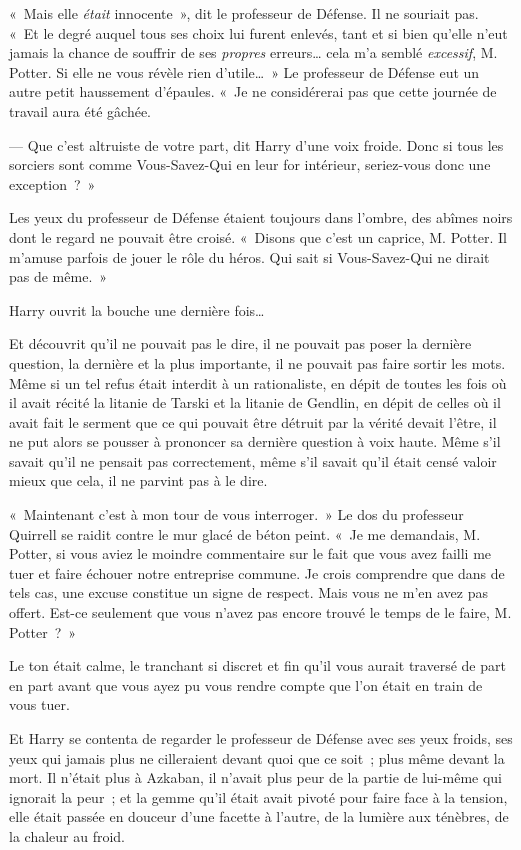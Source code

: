 «~Mais elle \emph{était} innocente~», dit le professeur de Défense. Il ne souriait pas. «~Et le degré auquel tous ses choix lui furent enlevés, tant et si bien qu'elle n'eut jamais la chance de souffrir de ses \emph{propres} erreurs… cela m'a semblé \emph{excessif}, M. Potter. Si elle ne vous révèle rien d'utile…~» Le professeur de Défense eut un autre petit haussement d'épaules. «~Je ne considérerai pas que cette journée de travail aura été gâchée.

--- Que c'est altruiste de votre part, dit Harry d'une voix froide. Donc si tous les sorciers sont comme Vous-Savez-Qui en leur for intérieur, seriez-vous donc une exception~?~»

Les yeux du professeur de Défense étaient toujours dans l'ombre, des abîmes noirs dont le regard ne pouvait être croisé. «~Disons que c'est un caprice, M. Potter. Il m'amuse parfois de jouer le rôle du héros. Qui sait si Vous-Savez-Qui ne dirait pas de même.~»

Harry ouvrit la bouche une dernière fois…

Et découvrit qu'il ne pouvait pas le dire, il ne pouvait pas poser la dernière question, la dernière et la plus importante, il ne pouvait pas faire sortir les mots. Même si un tel refus était interdit à un rationaliste, en dépit de toutes les fois où il avait récité la litanie de Tarski et la litanie de Gendlin, en dépit de celles où il avait fait le serment que ce qui pouvait être détruit par la vérité devait l'être, il ne put alors se pousser à prononcer sa dernière question à voix haute. Même s'il savait qu'il ne pensait pas correctement, même s'il savait qu'il était censé valoir mieux que cela, il ne parvint pas à le dire.

«~Maintenant c'est à mon tour de vous interroger.~» Le dos du professeur Quirrell se raidit contre le mur glacé de béton peint. «~Je me demandais, M. Potter, si vous aviez le moindre commentaire sur le fait que vous avez failli me tuer et faire échouer notre entreprise commune. Je crois comprendre que dans de tels cas, une excuse constitue un signe de respect. Mais vous ne m'en avez pas offert. Est-ce seulement que vous n'avez pas encore trouvé le temps de le faire, M. Potter~?~»

Le ton était calme, le tranchant si discret et fin qu'il vous aurait traversé de part en part avant que vous ayez pu vous rendre compte que l'on était en train de vous tuer.

Et Harry se contenta de regarder le professeur de Défense avec ses yeux froids, ses yeux qui jamais plus ne cilleraient devant quoi que ce soit~; plus même devant la mort. Il n'était plus à Azkaban, il n'avait plus peur de la partie de lui-même qui ignorait la peur~; et la gemme qu'il était avait pivoté pour faire face à la tension, elle était passée en douceur d'une facette à l'autre, de la lumière aux ténèbres, de la chaleur au froid.

